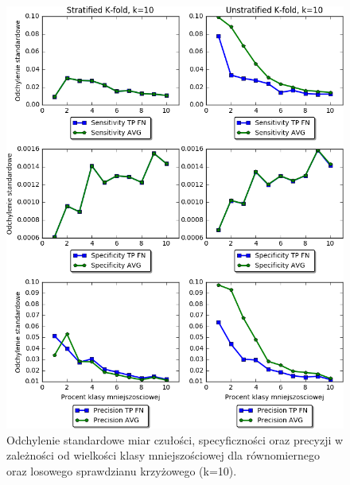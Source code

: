 \begin{figure}[H]
	\centering
	\includegraphics[width=\textwidth]{./images/stdwsk.png}
	\caption{Odchylenie standardowe miar czułości, specyficzności oraz precyzji w zależności od wielkości klasy mniejszościowej dla równomiernego oraz losowego sprawdzianu krzyżowego (k=10).}
	\label{fig:wskaznikistd}
\end{figure}
